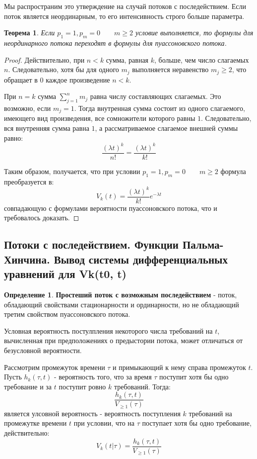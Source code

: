 \documentclass[aps,%
12pt,%
final,%
oneside,
onecolumn,%
musixtex, %
superscriptaddress,%
centertags]{article} %
\theoremstyle{plain}
\newtheorem{theorem}{Теорема}[section] %
\theoremstyle{definition}
\newtheorem{definition}{Определение}[subsection]
\theoremstyle{remark}
\begin{document}
Мы распространим это утверждение на случай потоков с последействием. Если поток является неординарным, то его интенсивность строго больше параметра.  

\begin{theorem}
	Если $p_1=1,p_m=0 \qquad m \geq 2$ условие выполняется, то формулы для неординарного потока переходят в формулы для пуассоновского потока.
\end{theorem} 
\begin{proof}
	Действительно, при $n<k$ сумма, равная $k$, больше, чем число слагаемых $n$. Следовательно, хотя бы для одного $m_j$ выполняется неравенство $m_j \geq 2$, что обращает в $0$ каждое произведение $n<k$. 

	При $n=k$ сумма $\sum\limits_{j=1}^n m_j$ равна числу составляющих слагаемых. Это возможно, если $m_j=1$. Тогда внутренная сумма состоит из одного слагаемого, имеющего вид произведения, все сомножители которого равны $1$. Следовательно, вся внутренняя сумма равна $1$, а рассматриваемое слагаемое внешней суммы равно:
	$$\frac{(\lambda t)^k}{n!}=\frac{(\lambda t)^k}{k!}$$

	Таким образом, получается, что при условии $p_1=1,p_m=0 \qquad m \geq 2$ формула преобразуется в:
	$$V_k(t) = \frac{(\lambda t)^k}{k!} e^{-\lambda t}$$
	совпадающую с формулами вероятности пуассоновского потока, что и требовалось доказать.
\end{proof}

\newpage
\subsection{Потоки с последействием. Функции Пальма-Хинчина. Вывод системы дифференциальных уравнений для Vk(t0, t)}

\begin{definition}
	\textbf{Простеший поток с возможным последействием} - поток, обладающий свойствами стационарности и ординарности, но не обладающий третим свойством пуассоновского потока.

	Условная вероятность постулпления некоторого числа требований на $t$, вычисленная при предположениях о предыстории потока, может отличаться от безусловной вероятности.
\end{definition}

Рассмотрим промежуток времени $\tau$ и примыкающий к нему справа промежуток $t$. Пусть $h_k(\tau,t)$ - вероятность того, что за время $\tau$ поступит хотя бы одно требование и за $t$ поступит ровно $k$ требований. Тогда:
$$\frac{h_k(\tau,t)}{V_{\geq 1}(\tau)}$$
является улсовной вероятность - вероятность поступления $k$ требований на промежутке времени $t$  при условии, что на $\tau$ поступает хотя бы одно требование, действительно:
$$V_k(t | \tau) = \frac{h_k(\tau,t)}{V_{\geq 1}(\tau)}$$
\end{document}
